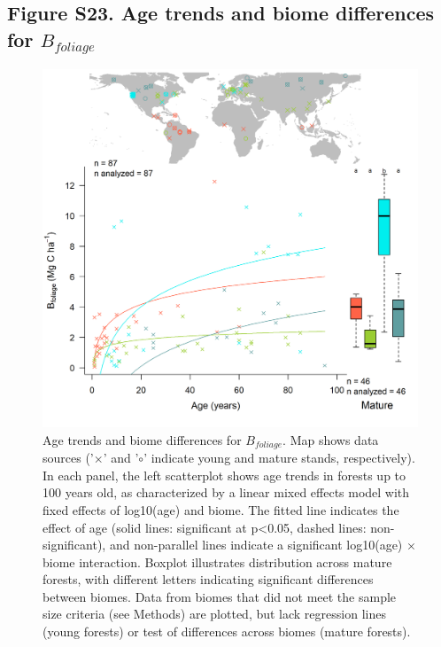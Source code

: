 \documentclass[
]{article}
\begin{document}
\newpage

\hypertarget{figure-s23.-age-trends-and-biome-differences-for-b_foliage}{%
\subsection{\texorpdfstring{Figure S23. Age trends and biome differences
for
\(B_{foliage}\)}{Figure S23. Age trends and biome differences for B\_\{foliage\}}}\label{figure-s23.-age-trends-and-biome-differences-for-b_foliage}}

\begin{figure}[H]

{\centering \includegraphics[width=1\linewidth]{tables_figures/age_trends/biomass_foliage_with_map} 

}

\caption{Age trends and biome differences for $B_{foliage}$. Map shows data sources ('$\times$' and '$\circ$' indicate young and mature stands, respectively). In each panel, the left scatterplot shows age trends in forests up to 100 years old, as characterized by a linear mixed effects model with fixed effects of log10(age) and biome. The fitted line indicates the effect of age (solid lines: significant at p<0.05, dashed lines: non-significant), and non-parallel lines indicate a significant log10(age) $\times$ biome interaction. Boxplot illustrates distribution across mature forests, with different letters indicating significant differences between biomes. Data from biomes that did not meet the sample size criteria (see Methods) are plotted, but lack regression lines (young forests) or test of differences across biomes (mature forests).}\label{fig:unnamed-chunk-26}
\end{figure}
\end{document}
